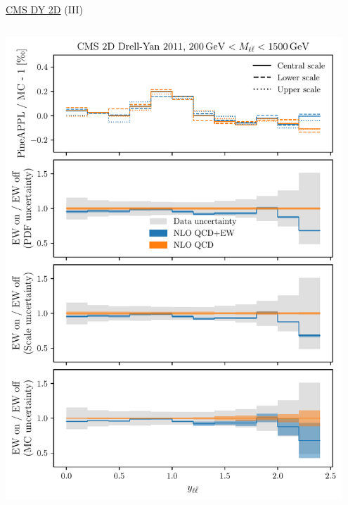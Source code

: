 \begin{frame}{\href{https://arxiv.org/abs/1412.1115}{CMS DY 2D} (III)}
\begin{columns}
\begin{column}{0.5\textwidth}
\includegraphics[width=0.95\textwidth]{ew_corrections/figures/pineappl_CMSDY2D11_bin6}
\end{column}
\end{columns}
\end{frame}

